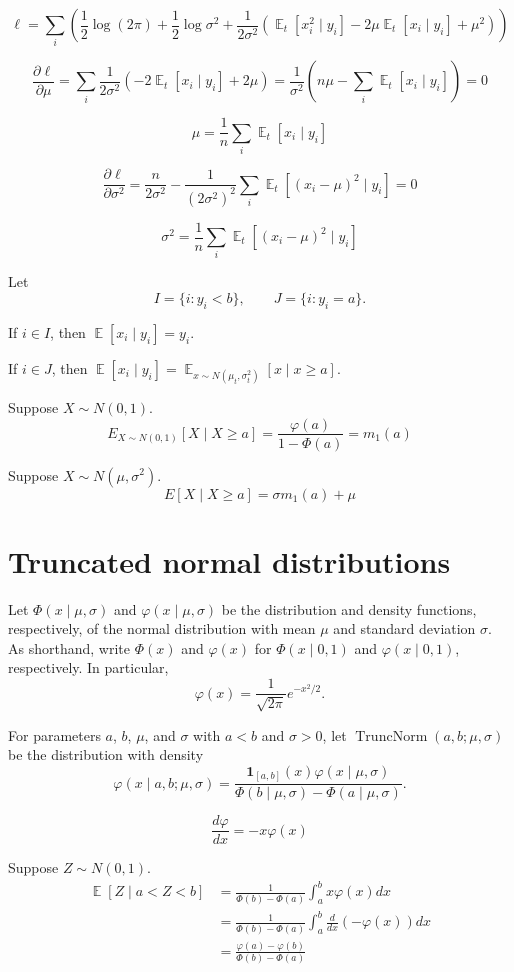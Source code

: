 \documentclass{amsart}
\renewcommand{\phi}{\varphi}
\newcommand{\One}{\mathbf{1}}
\DeclareMathOperator{\TruncNorm}{TruncNorm}
\DeclareMathOperator{\Exp}{\mathbb{E}}
\begin{document}
\[
\ell = \sum_i\left(\frac12\log(2\pi) + \frac12\log\sigma^2 + \frac1{2\sigma^2}(\Exp_t[x_i^2\mid y_i] - 2\mu \Exp_t[x_i\mid y_i] + \mu^2)\right)
\]

\[
\frac{\partial \ell}{\partial \mu} = \sum_i\frac1{2\sigma^2}\left(- 2 \Exp_t[x_i\mid y_i] + 2\mu\right)
= \frac1{\sigma^2}\left(n\mu -\sum_i\Exp_t[x_i\mid y_i]\right)=0
\]

\[
\mu = \frac1n\sum_i\Exp_t[x_i\mid y_i]
\]

\[
\frac{\partial \ell}{\partial \sigma^2}
= \frac{n}{2\sigma^2} - \frac1{(2\sigma^2)^2}\sum_i\Exp_t\left[(x_i - \mu)^2\mid y_i\right]=0
\]

\[
\sigma^2 = \frac1n\sum_i\Exp_t\left[(x_i - \mu)^2\mid y_i\right]
\]

Let
\[
I = \{i : y_i < b\},\qquad J = \{i : y_i = a\}.
\]

If $i\in I$, then $\Exp[x_i\mid y_i] = y_i$.

If $i\in J$, then $\Exp[x_i\mid y_i] = \Exp_{x\sim N(\mu_t, \sigma_t^2)}[x\mid x \geq a]$.

Suppose $X\sim N(0, 1)$.
\[
E_{X\sim N(0, 1)}[X\mid X \geq a] = \frac{\varphi(a)}{1 - \Phi(a)}
= m_1(a)
\]

Suppose $X\sim N(\mu, \sigma^2)$.
\[
E[X\mid X\geq a] = \sigma m_1(a) + \mu
\]

\section{Truncated normal distributions}

Let $\Phi(x\mid \mu, \sigma)$ and $\phi(x\mid\mu, \sigma)$ be the
distribution and density functions, respectively, of the normal
distribution with mean $\mu$ and standard deviation $\sigma$.
As shorthand, write $\Phi(x)$ and $\phi(x)$ for $\Phi(x\mid 0, 1)$
and $\phi(x\mid 0, 1)$, respectively. In particular,
\[
\phi(x) = \frac1{\sqrt{2\pi}}e^{-x^2/2}.
\]

For parameters $a$, $b$, $\mu$, and $\sigma$ with $a < b$ and
$\sigma > 0$, let $\TruncNorm(a, b; \mu, \sigma)$ be the distribution
with density
\[
\phi(x\mid a, b; \mu,\sigma)
= \frac{\One_{[a, b]}(x)\phi(x\mid\mu,\sigma)}
{\Phi(b\mid\mu,\sigma) - \Phi(a\mid \mu, \sigma)}.
\] 

\[
\frac{d\phi}{dx} = -x\phi(x)
\]

Suppose $Z\sim N(0, 1)$.
\begin{align*}
    \Exp[Z\mid a < Z < b] &= \frac1{\Phi(b) - \Phi(a)}\int_a^b x\phi(x)dx\\
    &= \frac1{\Phi(b) - \Phi(a)}\int_a^b \frac{d}{dx}(-\phi(x))dx\\
    &= \frac{\phi(a) - \phi(b)}{\Phi(b) - \Phi(a)}
\end{align*}
\end{document}
